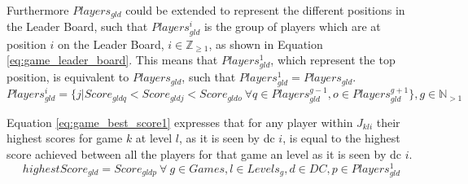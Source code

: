 Furthermore $Players_{gld}$ could be extended to represent the different positions in the Leader Board, such that $Players^{i}_{gld}$ is the group of players which are at position $i$ on the Leader Board, $i \in \mathbb{Z}_{\ge 1}$, as shown in Equation \ref{eq:game_leader_board}. This means that $Players^{1}_{gld}$, which represent the top position, is equivalent to $Players_{gld}$, such that $Players^{1}_{gld} = Players_{gld}$.
\begin{equation} \label{eq:game_leader_board}
	Players^{i}_{gld} = \{j | Score_{gldq} < Score_{gldj} < Score_{gldo} ~ \forall q \in Players^{g-1}_{gld}, o \in Players^{g+1}_{gld}\}, g \in \mathbb{N}_{> 1}
\end{equation}

Equation \ref{eq:game_best_score1} expresses that for any player within $J_{kli}$ their highest scores for game $k$ at level $l$, as it is seen by \gls{dc} $i$, is equal to the highest score achieved between all the players for that game an level as it is seen by \gls{dc} $i$.
\begin{equation} \label{eq:game_best_score1}
	highestScore_{gld} = Score_{gldp} ~ \forall ~ g \in Games, l \in Levels_{g}, d \in  DC, p \in Players^{1}_{gld}
\end{equation}
